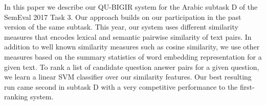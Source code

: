 In this paper we describe our QU-BIGIR system for the Arabic subtask D of the SemEval 2017 Task 3. Our approach builds on our participation in the past version of the same subtask. This year, our system uses different similarity measures that encodes lexical and semantic pairwise similarity of text pairs. In addition to well known similarity measures such as cosine similarity, we use other measures based on the summary statistics of word embedding representation for a given text. To rank a list of candidate question answer pairs for a given question, we learn a linear SVM classifier over our similarity features. Our best resulting run came second in subtask D with a very competitive performance to the first-ranking system.
